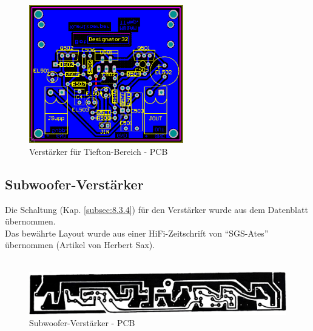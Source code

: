 \begin{figure} [H]
	\centering	
	\includegraphics[width=0.6\textwidth]{img/Print5/5_TTVerstaerker-PCB.PNG}
	\caption{Verstärker für Tiefton-Bereich - PCB}
	\label {fig:5.2.3.1}
\end{figure}


\newpage
\subsection{Subwoofer-Verstärker}
Die Schaltung (Kap. \ref{subsec:8.3.4}) für den Verstärker wurde aus dem Datenblatt übernommen.\\
Das bewährte Layout wurde aus einer HiFi-Zeitschrift von \enquote{SGS-Ates} übernommen (Artikel von Herbert Sax).
\\ \\

\begin{figure} [H]
	\centering	
	\includegraphics[width=1\textwidth]{img/SubwooferAmpLayout.PNG}
	\caption{Subwoofer-Verstärker - PCB}
	\label {fig:5.2.3.2}
\end{figure}